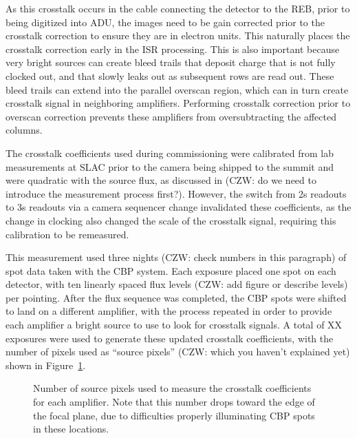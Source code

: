 As this crosstalk occurs in the cable connecting the detector to the REB, prior to being digitized into ADU, the images need to be gain corrected prior to the crosstalk correction to ensure they are in electron units.
This naturally places the crosstalk correction early in the ISR processing. This is also important because very bright sources can create bleed trails that deposit charge that is not fully clocked out, and that slowly leaks out as subsequent rows are read out.
These bleed trails can extend into the parallel overscan region, which can in turn create crosstalk signal in neighboring amplifiers.
Performing crosstalk correction prior to overscan correction prevents these amplifiers from oversubtracting the affected columns.

The crosstalk coefficients used during commissioning were calibrated from lab measurements at SLAC prior to the camera being shipped to the summit and were quadratic with the source flux, as discussed in \citet{2021JATIS...7d48002S} (CZW: do we need to introduce the measurement process first?).
However, the switch from 2s readouts to 3s readouts via a camera sequencer change invalidated these coefficients, as the change in clocking also changed the scale of the crosstalk signal, requiring this calibration to be remeasured.

This measurement used three nights (CZW: check numbers in this paragraph) of spot data taken with the CBP system.
Each exposure placed one spot on each detector, with ten linearly spaced flux levels (CZW: add figure or describe levels) per pointing.
After the flux sequence was completed, the CBP spots were shifted to land on a different amplifier, with the process repeated in order to provide each amplifier a bright source to use to look for crosstalk signals.
A total of XX exposures were used to generate these updated crosstalk coefficients, with the number of pixels used as ``source pixels'' (CZW: which you haven't explained yet) shown in Figure~\ref{fig:crosstalk-source-pixels}.

\begin{figure}[t]
    \centering
    \caption{Number of source pixels used to measure the crosstalk coefficients for each amplifier.
      Note that this number drops toward the edge of the focal plane, due to difficulties properly illuminating CBP spots in these locations.}
    \label{fig:crosstalk-source-pixels}
\end{figure}

